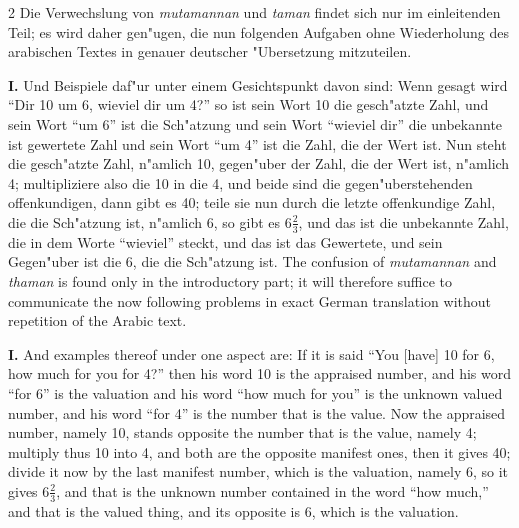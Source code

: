 \documentclass[10pt,a4paper]{article}
\renewcommand{\switchcolumn}{\syncronize\nointerlineskip\columnbreak}
\newcommand{\enquote}[1]{``#1''}
\begin{document}
\begin{paracol}{2}
Die Verwechslung von \textit{mutamannan} und \textit{taman} findet sich nur im einleitenden Teil; es wird daher gen"ugen, die nun folgenden Aufgaben ohne Wiederholung des arabischen Textes in genauer deutscher "Ubersetzung mitzuteilen.

\textbf{I.} Und Beispiele daf"ur unter einem Gesichtspunkt davon sind: Wenn gesagt wird \enquote{Dir 10 um 6, wieviel dir um 4?} so ist sein Wort 10 die gesch"atzte Zahl, und sein Wort \enquote{um 6} ist die Sch"atzung und sein Wort \enquote{wieviel dir} die unbekannte ist gewertete Zahl und sein Wort \enquote{um 4} ist die Zahl, die der Wert ist. Nun steht die gesch"atzte Zahl, n"amlich 10, gegen"uber der Zahl, die der Wert ist, n"amlich 4; multipliziere also die 10 in die 4, und beide sind die gegen"uberstehenden offenkundigen, dann gibt es 40; teile sie nun durch die letzte offenkundige Zahl, die die Sch"atzung ist, n"amlich 6, so gibt es $6\frac{2}{3}$, und das ist die unbekannte Zahl, die in dem Worte \enquote{wieviel} steckt, und das ist das Gewertete, und sein Gegen"uber ist die 6, die die Sch"atzung ist.
\switchcolumn
The confusion of \textit{mutamannan} and \textit{thaman} is found only in the introductory part; it will therefore suffice to communicate the now following problems in exact German translation without repetition of the Arabic text.

\textbf{I.} And examples thereof under one aspect are: If it is said ``You [have] 10 for 6, how much for you for 4?'' then his word 10 is the appraised number, and his word ``for 6'' is the valuation and his word ``how much for you'' is the unknown valued number, and his word ``for 4'' is the number that is the value. Now the appraised number, namely 10, stands opposite the number that is the value, namely 4; multiply thus 10 into 4, and both are the opposite manifest ones, then it gives 40; divide it now by the last manifest number, which is the valuation, namely 6, so it gives $6\frac{2}{3}$, and that is the unknown number contained in the word ``how much,'' and that is the valued thing, and its opposite is 6, which is the valuation.
\end{paracol}
\end{document}
